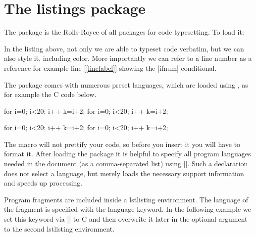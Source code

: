 \section{The listings package}

\begin{multicols}{2}
The  package is the Rolls-Royce of all packages for code typesetting. To load it:


\begin{Code}
\begin{listings}
\def\test(*@\sidenote{The definition of a test macro}@*)#1{%
  \ifnum #1<22 \true \else \false\fi {(*@\label{linelabel}@*)}
\end{listings}
\end{Code}

In the listing above, not only we are able to typeset code verbatim, but we can also style it, including color. More importantly we can refer to a line number as a reference for example line [\ref{linelabel}] showing the |ifnum| conditional.

The package comes with numerous preset languages, which are loaded using , as for example the C code below.
\end{multicols}


\lstset{language=C}
\begin{cCode}        
for i=0; i<20; i++ {        
   k=i+2;                  
}
for i=0; i<20; i++ {
   k=i+2;
}
\end{cCode}

\begin{cCode}
for i=0; i<20; i++ {
   k=i+2;
}
for i=0; i<20; i++ {
   k=i+2;
}
\end{cCode}





The macro will not prettify your code, so before you insert it you will have to format it. After loading the package it is helpful to specify all program languages
needed in the document (as a comma-separated list) using ||.
Such a declaration does not select a language, but merely loads the necessary
support information and speeds up processing.

Program fragments are included inside a  lstlisting environment. The language
of the fragment is specified with the language keyword. In the following
example we set this keyword via ||  to C and then overwrite it later in the
optional argument to the second lstlisting environment.

